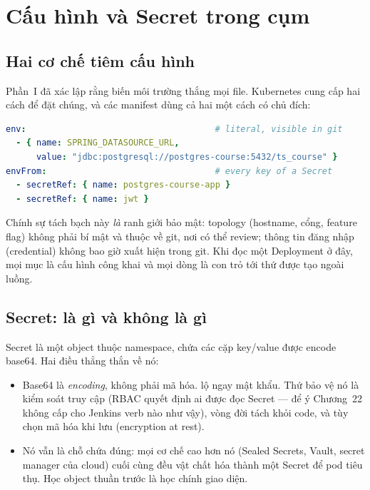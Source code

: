 \chapter{Cấu hình và Secret trong cụm}
\label{ch:secrets}

\section{Hai cơ chế tiêm cấu hình}

Phần~I đã xác lập rằng biến môi trường thắng mọi file. Kubernetes cung
cấp hai cách để đặt chúng, và các manifest dùng cả hai một cách có chủ
đích:

\begin{lstlisting}[language=yaml]
env:                                     # literal, visible in git
  - { name: SPRING_DATASOURCE_URL,
      value: "jdbc:postgresql://postgres-course:5432/ts_course" }
envFrom:                                 # every key of a Secret
  - secretRef: { name: postgres-course-app }
  - secretRef: { name: jwt }
\end{lstlisting}

Chính sự tách bạch này \emph{là} ranh giới bảo mật: topology (hostname,
cổng, feature flag) không phải bí mật và thuộc về git, nơi có thể review;
thông tin đăng nhập (credential) không bao giờ xuất hiện trong git. Khi
đọc một Deployment ở đây, mọi mục  là cấu hình công khai và
mọi dòng  là con trỏ tới thứ được tạo ngoài luồng.

\section{Secret: là gì và không là gì}

Secret là một object thuộc namespace, chứa các cặp key/value được
encode base64. Hai điều thẳng thắn về nó:

\begin{itemize}
  \item Base64 là \emph{encoding}, không phải mã hóa.
   lộ ngay mật khẩu. Thứ bảo vệ nó là
  kiểm soát truy cập (RBAC quyết định ai được đọc Secret --- để ý
  Chương~22 không cấp cho Jenkins verb nào như vậy), vòng đời tách khỏi
  code, và tùy chọn mã hóa khi lưu (encryption at rest).
  \item Nó vẫn là chỗ chứa đúng: mọi cơ chế cao hơn nó (Sealed Secrets,
  Vault, secret manager của cloud) cuối cùng đều vật chất hóa thành một
  Secret để pod tiêu thụ. Học object thuần trước là học chính giao diện.
\end{itemize}


